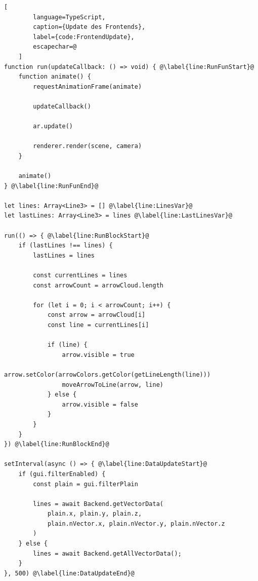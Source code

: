 \begin{codefloat}
	\begin{lstlisting}[
		language=TypeScript,
		caption={Update des Frontends},
		label={code:FrontendUpdate},
		escapechar=@
	]
function run(updateCallback: () => void) { @\label{line:RunFunStart}@
	function animate() {
		requestAnimationFrame(animate)

		updateCallback()

		ar.update()

		renderer.render(scene, camera)
	}

	animate()
} @\label{line:RunFunEnd}@

let lines: Array<Line3> = [] @\label{line:LinesVar}@
let lastLines: Array<Line3> = lines @\label{line:LastLinesVar}@

run(() => { @\label{line:RunBlockStart}@
	if (lastLines !== lines) {
		lastLines = lines

		const currentLines = lines
		const arrowCount = arrowCloud.length

		for (let i = 0; i < arrowCount; i++) {
			const arrow = arrowCloud[i]
			const line = currentLines[i]

			if (line) {
				arrow.visible = true
				arrow.setColor(arrowColors.getColor(getLineLength(line)))
				moveArrowToLine(arrow, line)
			} else {
				arrow.visible = false
			}
		}
	}
}) @\label{line:RunBlockEnd}@

setInterval(async () => { @\label{line:DataUpdateStart}@
	if (gui.filterEnabled) {
		const plain = gui.filterPlain

		lines = await Backend.getVectorData(
			plain.x, plain.y, plain.z,
			plain.nVector.x, plain.nVector.y, plain.nVector.z
		)
	} else {
		lines = await Backend.getAllVectorData();
	}
}, 500) @\label{line:DataUpdateEnd}@
	\end{lstlisting}
\end{codefloat}

